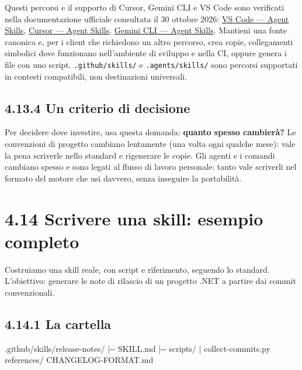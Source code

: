 \documentclass[
  italian,
  10pt,
]{book}
\newenvironment{Shaded}{\begin{snugshade}}{\end{snugshade}}
\newcommand{\NormalTok}[1]{#1}
\begin{document}
Questi percorsi e il supporto di Cursor, Gemini CLI e VS Code sono
verificati nella documentazione ufficiale consultata il 30 ottobre 2026:
\href{https://code.visualstudio.com/docs/agent-customization/agent-skills}{VS
Code --- Agent Skills}, \href{https://cursor.com/docs/skills}{Cursor ---
Agent Skills}, \href{https://geminicli.com/docs/cli/skills/}{Gemini CLI
--- Agent Skills}. Mantieni una fonte canonica e, per i client che
richiedono un altro percorso, crea copie, collegamenti simbolici dove
funzionano nell'ambiente di sviluppo e nella CI, oppure genera i file
con uno script. \texttt{.github/skills/} e \texttt{.agents/skills/} sono
percorsi supportati in contesti compatibili, non destinazioni
universali.

\subsection{4.13.4 Un criterio di
decisione}\label{un-criterio-di-decisione}

Per decidere dove investire, usa questa domanda: \textbf{quanto spesso
cambierà?} Le convenzioni di progetto cambiano lentamente (una volta
ogni qualche mese): vale la pena scriverle nello standard e rigenerare
le copie. Gli agenti e i comandi cambiano spesso e sono legati al flusso
di lavoro personale: tanto vale scriverli nel formato del motore che usi
davvero, senza inseguire la portabilità.

\section{4.14 Scrivere una skill: esempio
completo}\label{scrivere-una-skill-esempio-completo}

Costruiamo una skill reale, con script e riferimento, seguendo lo
standard. L'obiettivo: generare le note di rilascio di un progetto .NET
a partire dai commit convenzionali.

\subsection{4.14.1 La cartella}\label{la-cartella}

\begin{Shaded}
\begin{Highlighting}[]
\NormalTok{.github/skills/release{-}notes/}
\NormalTok{|{-}{-} SKILL.md}
\NormalTok{|{-}{-} scripts/}
\NormalTok{|   \textasciigrave{}{-}{-} collect{-}commits.py}
\NormalTok{\textasciigrave{}{-}{-} references/}
\NormalTok{    \textasciigrave{}{-}{-} CHANGELOG{-}FORMAT.md}
\end{Highlighting}
\end{Shaded}
\end{document}
